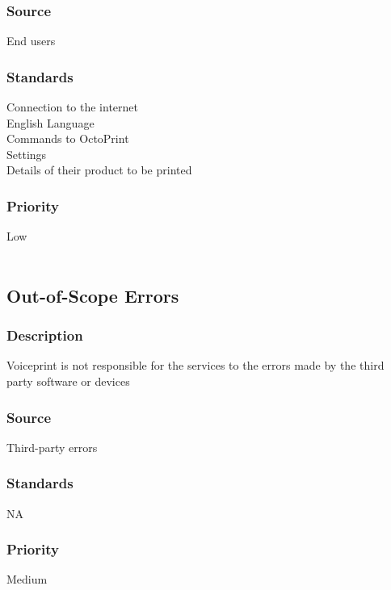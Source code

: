 \subsubsection{Source}
End users
\subsubsection{Standards}
Connection to the internet\\
English Language\\
Commands to OctoPrint\\
Settings\\
Details of their product to be printed
\subsubsection{Priority}
Low
\\
\\
\subsection{Out-of-Scope Errors}
\subsubsection{Description}
Voiceprint is not responsible for the services to the errors made by the third party software or devices
\subsubsection{Source}
Third-party errors
\subsubsection{Standards}
NA
\subsubsection{Priority}
Medium

